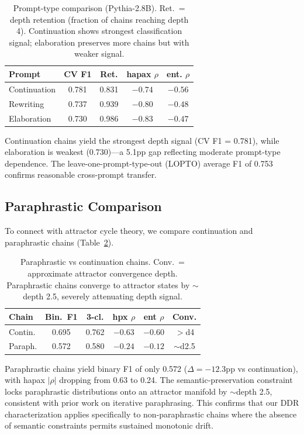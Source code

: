\documentclass[11pt,a4paper]{article}
\begin{document}
\begin{table}[t]
\centering
\small
\begin{tabular}{lcccc}
\toprule
\textbf{Prompt} & \textbf{CV F1} & \textbf{Ret.} & \textbf{hapax $\rho$} & \textbf{ent. $\rho$} \\
\midrule
Continuation & 0.781 & 0.831 & $-0.74$ & $-0.56$ \\
Rewriting & 0.737 & 0.939 & $-0.80$ & $-0.48$ \\
Elaboration & 0.730 & 0.986 & $-0.83$ & $-0.47$ \\
\bottomrule
\end{tabular}
\caption{Prompt-type comparison (Pythia-2.8B). Ret.\ = depth retention (fraction of chains reaching depth 4). Continuation shows strongest classification signal; elaboration preserves more chains but with weaker signal.}
\label{tab:prompt}
\end{table}

Continuation chains yield the strongest depth signal (CV F1 = 0.781), while elaboration is weakest (0.730)---a 5.1pp gap reflecting moderate prompt-type dependence. The leave-one-prompt-type-out (LOPTO) average F1 of 0.753 confirms reasonable cross-prompt transfer.

\subsection{Paraphrastic Comparison}
\label{sec:paraphrastic}

To connect with attractor cycle theory, we compare continuation and paraphrastic chains (Table~\ref{tab:para}).

\begin{table}[t]
\centering
\small
\begin{tabular}{lccccc}
\toprule
\textbf{Chain} & \textbf{Bin.~F1} & \textbf{3-cl.} & \textbf{hpx $\rho$} & \textbf{ent $\rho$} & \textbf{Conv.} \\
\midrule
Contin. & 0.695 & 0.762 & $-0.63$ & $-0.60$ & $>$d4 \\
Paraph. & 0.572 & 0.580 & $-0.24$ & $-0.12$ & ${\sim}$d2.5 \\
\bottomrule
\end{tabular}
\caption{Paraphrastic vs continuation chains. Conv.\ = approximate attractor convergence depth. Paraphrastic chains converge to attractor states by ${\sim}$depth 2.5, severely attenuating depth signal.}
\label{tab:para}
\end{table}

Paraphrastic chains yield binary F1 of only 0.572 ($\Delta = -12.3$pp vs continuation), with hapax $|\rho|$ dropping from 0.63 to 0.24. The semantic-preservation constraint locks paraphrastic distributions onto an attractor manifold by ${\sim}$depth 2.5, consistent with prior work on iterative paraphrasing. This confirms that our DDR characterization applies specifically to non-paraphrastic chains where the absence of semantic constraints permits sustained monotonic drift.
\end{document}
